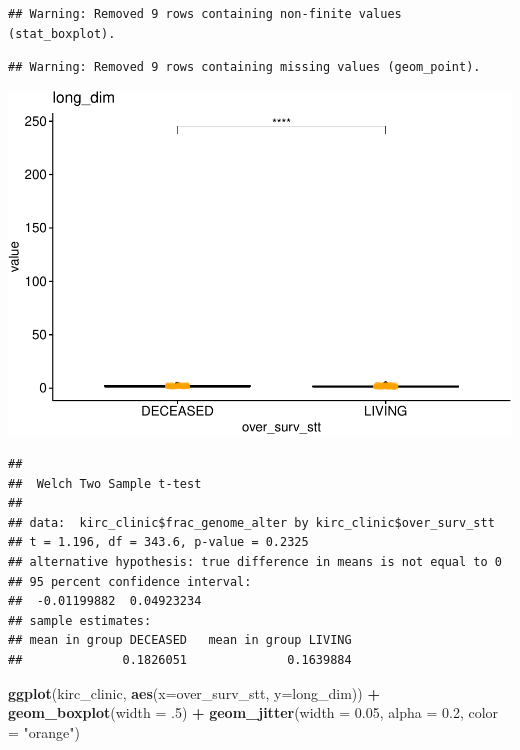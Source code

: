 \documentclass[]{article}
\newenvironment{Shaded}{\begin{snugshade}}{\end{snugshade}}
\newcommand{\KeywordTok}[1]{\textcolor[rgb]{0.13,0.29,0.53}{\textbf{#1}}}
\newcommand{\DataTypeTok}[1]{\textcolor[rgb]{0.13,0.29,0.53}{#1}}
\newcommand{\DecValTok}[1]{\textcolor[rgb]{0.00,0.00,0.81}{#1}}
\newcommand{\FloatTok}[1]{\textcolor[rgb]{0.00,0.00,0.81}{#1}}
\newcommand{\StringTok}[1]{\textcolor[rgb]{0.31,0.60,0.02}{#1}}
\newcommand{\OperatorTok}[1]{\textcolor[rgb]{0.81,0.36,0.00}{\textbf{#1}}}
\newcommand{\NormalTok}[1]{#1}
\begin{document}
\begin{verbatim}
## Warning: Removed 9 rows containing non-finite values (stat_boxplot).
\end{verbatim}

\begin{verbatim}
## Warning: Removed 9 rows containing missing values (geom_point).
\end{verbatim}

\includegraphics{figs/render-unnamed-chunk-12-4.pdf}

\begin{Shaded}
\end{Shaded}

\begin{verbatim}
## 
##  Welch Two Sample t-test
## 
## data:  kirc_clinic$frac_genome_alter by kirc_clinic$over_surv_stt
## t = 1.196, df = 343.6, p-value = 0.2325
## alternative hypothesis: true difference in means is not equal to 0
## 95 percent confidence interval:
##  -0.01199882  0.04923234
## sample estimates:
## mean in group DECEASED   mean in group LIVING 
##              0.1826051              0.1639884
\end{verbatim}

\begin{Shaded}
\begin{Highlighting}[]
\KeywordTok{ggplot}\NormalTok{(kirc_clinic, }\KeywordTok{aes}\NormalTok{(}\DataTypeTok{x=}\NormalTok{over_surv_stt, }\DataTypeTok{y=}\NormalTok{long_dim)) }\OperatorTok{+}
\StringTok{  }\KeywordTok{geom_boxplot}\NormalTok{(}\DataTypeTok{width =}\NormalTok{ .}\DecValTok{5}\NormalTok{) }\OperatorTok{+}
\StringTok{  }\KeywordTok{geom_jitter}\NormalTok{(}\DataTypeTok{width =} \FloatTok{0.05}\NormalTok{, }\DataTypeTok{alpha =} \FloatTok{0.2}\NormalTok{, }\DataTypeTok{color =} \StringTok{"orange"}\NormalTok{)}
\end{Highlighting}
\end{Shaded}
\end{document}

